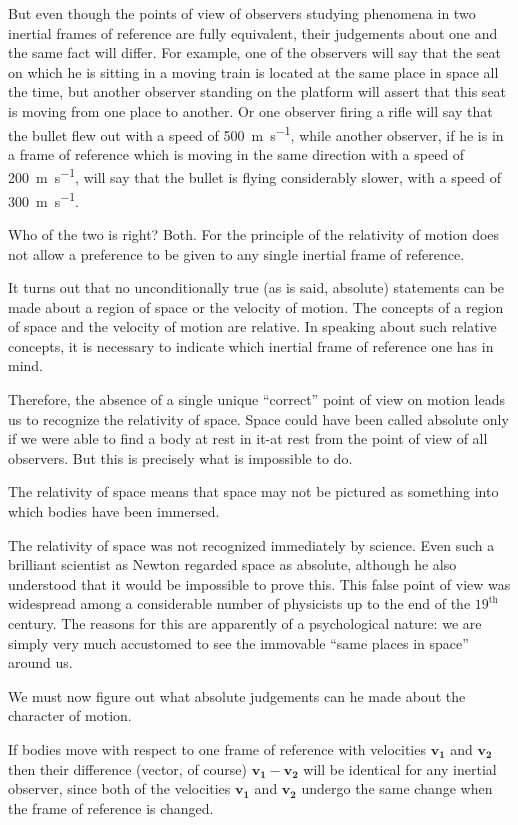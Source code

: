But even though the points of view of observers studying phenomena in two inertial frames of reference are fully equivalent, their judgements about one and the same fact will differ. For example, one of the observers will say that the seat on which he is sitting in a moving train is located at the same place in space all the time, but another observer standing on the platform will assert that this seat is moving from one place to another. Or one observer firing a rifle will say that the bullet flew out with a speed of \SI{500}{\meter\per\second}, while another observer, if he is in a frame of reference which is moving in the same direction with a speed of \SI{200}{\meter\per\second}, will say that the bullet is flying considerably slower, with a speed of \SI{300}{\meter\per\second}. 

Who of the two is right? Both. For the principle of the
relativity of motion does not allow a preference to be
given to any single inertial frame of reference.

It turns out that no unconditionally true (as is said,
absolute) statements can be made about a region of space
or the velocity of motion. The concepts of a region of
space and the velocity of motion are relative. In speaking
about such relative concepts, it is necessary to indicate
which inertial frame of reference one has in mind.

Therefore, the absence of a single unique ``correct'' point
of view on motion leads us to recognize the relativity of
space. Space could have been called absolute only if we
were able to find a body at rest in it-at rest from the
point of view of all observers. But this is precisely what
is impossible to do.

The relativity of space means that space may not be
pictured as something into which bodies have been immersed.

The relativity of space was not recognized immediately
by science. Even such a brilliant scientist as Newton
regarded space as absolute, although he also understood
that it would be impossible to prove this. This false point
of view was widespread among a considerable number of
physicists up to the end of the $19^{\textrm{th}}$ century. The reasons for this are apparently of a psychological nature: we are
simply very much accustomed to see the immovable
``same places in space'' around us.

We must now figure out what absolute judgements can he made about the character of motion.

If bodies move with respect to one frame of reference
with velocities $\mathbf{v_{1}}$ and $\mathbf{v_{2}}$ then their difference (vector, of course) $\mathbf{v_{1}} - \mathbf{v_{2}}$ will be identical for any inertial observer, since both of the velocities $\mathbf{v_{1}}$ and $\mathbf{v_{2}}$ undergo the same change when the frame of reference is changed.

